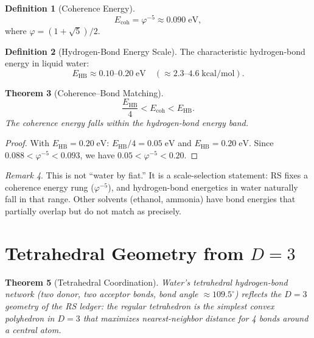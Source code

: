 \documentclass[12pt,a4paper]{article}
\newtheorem{theorem}{Theorem}[section]
\theoremstyle{definition}
\newtheorem{definition}[theorem]{Definition}
\theoremstyle{remark}
\newtheorem{remark}[theorem]{Remark}
\begin{document}
\begin{definition}[Coherence Energy]
\begin{equation}
  E_{\mathrm{coh}} = \varphi^{-5} \approx 0.090\;\mathrm{eV},
\end{equation}
where $\varphi = (1+\sqrt{5})/2$.
\end{definition}

\begin{definition}[Hydrogen-Bond Energy Scale]
The characteristic hydrogen-bond energy in liquid water:
\begin{equation}
  E_{\mathrm{HB}} \approx 0.10\text{--}0.20\;\mathrm{eV}
  \quad (\approx 2.3\text{--}4.6\;\mathrm{kcal/mol}).
\end{equation}
\end{definition}

\begin{theorem}[Coherence--Bond Matching]
\label{thm:matching}
\begin{equation}
  \boxed{\frac{E_{\mathrm{HB}}}{4} < E_{\mathrm{coh}}
  < E_{\mathrm{HB}}.}
\end{equation}
The coherence energy falls within the hydrogen-bond energy band.
\end{theorem}

\begin{proof}
With $E_{\mathrm{HB}} = 0.20\;\mathrm{eV}$:
$E_{\mathrm{HB}}/4 = 0.05\;\mathrm{eV}$ and
$E_{\mathrm{HB}} = 0.20\;\mathrm{eV}$.  Since
$0.088 < \varphi^{-5} < 0.093$, we have
$0.05 < \varphi^{-5} < 0.20$.
\end{proof}

\begin{remark}
This is not ``water by fiat.''  It is a scale-selection statement:
RS fixes a coherence energy rung ($\varphi^{-5}$), and
hydrogen-bond energetics in water naturally fall in that range.
Other solvents (ethanol, ammonia) have bond energies that partially
overlap but do not match as precisely.
\end{remark}

\section{Tetrahedral Geometry from $D = 3$}
\label{sec:tetrahedral}

\begin{theorem}[Tetrahedral Coordination]
Water's tetrahedral hydrogen-bond network (two donor, two acceptor
bonds, bond angle $\approx 109.5^\circ$) reflects the $D = 3$
geometry of the RS ledger: the regular tetrahedron is the simplest
convex polyhedron in $D = 3$ that maximizes nearest-neighbor
distance for 4 bonds around a central atom.
\end{theorem}
\end{document}
